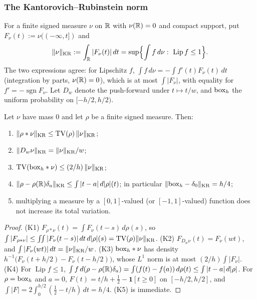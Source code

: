 \subsubsection{The Kantorovich--Rubinstein norm}\label{sec:kr}

For a finite signed measure $\nu$ on $\mathbb{R}$ with $\nu(\mathbb{R})=0$ and compact support, put $F_\nu(t):=\nu((-\infty,t])$ and
\[
  \lVert \nu\rVert_{\mathrm{KR}}:=\int_{\mathbb{R}}|F_\nu(t)|\,dt=\sup\Bigl\{\int f\,d\nu:\ \operatorname{Lip}f\le1\Bigr\}.
\]
The two expressions agree: for Lipschitz $f$, $\int f\,d\nu=-\int f'(t)F_\nu(t)\,dt$ (integration by parts, $\nu(\mathbb{R})=0$),
which is at most $\int|F_\nu|$, with equality for $f'=-\operatorname{sgn}F_\nu$. Let $D_w$ denote the push-forward under
$t\mapsto t/w$, and $\mathrm{box}_h$ the uniform probability on $[-h/2,h/2)$.

\begin{lemma}\label{lem:kr-facts}
Let $\nu$ have mass $0$ and let $\rho$ be a finite signed measure. Then:
\begin{enumerate}[label=(K\arabic*)]
\item $\lVert \rho*\nu\rVert_{\mathrm{KR}}\le\operatorname{TV}(\rho)\,\lVert \nu\rVert_{\mathrm{KR}}$;
\item $\lVert D_w\nu\rVert_{\mathrm{KR}}=\lVert \nu\rVert_{\mathrm{KR}}/w$;
\item $\operatorname{TV}(\mathrm{box}_h*\nu)\le(2/h)\,\lVert \nu\rVert_{\mathrm{KR}}$;
\item $\lVert \rho-\rho(\mathbb{R})\delta_a\rVert_{\mathrm{KR}}\le\int|t-a|\,d|\rho|(t)$; in particular $\lVert \mathrm{box}_h-\delta_0\rVert_{\mathrm{KR}}=h/4$;
\item multiplying a measure by a $[0,1]$-valued (or $[-1,1]$-valued) function does not increase its total variation.
\end{enumerate}
\end{lemma}

\begin{proof}
(K1) $F_{\rho*\nu}(t)=\int F_\nu(t-s)\,d\rho(s)$, so $\int|F_{\rho*\nu}|\le\iint|F_\nu(t-s)|\,dt\,d|\rho|(s)=\operatorname{TV}(\rho)\lVert \nu\rVert_{\mathrm{KR}}$.
(K2) $F_{D_w\nu}(t)=F_\nu(wt)$, and $\int|F_\nu(wt)|\,dt=\lVert \nu\rVert_{\mathrm{KR}}/w$.
(K3) $\mathrm{box}_h*\nu$ has density $h^{-1}\bigl(F_\nu(t+h/2)-F_\nu(t-h/2)\bigr)$, whose $L^1$ norm is at most $(2/h)\int|F_\nu|$.
(K4) For $\operatorname{Lip}f\le1$, $\int f\,d(\rho-\rho(\mathbb{R})\delta_a)=\int(f(t)-f(a))\,d\rho(t)\le\int|t-a|\,d|\rho|$. For
$\rho=\mathrm{box}_h$ and $a=0$, $F(t)=t/h+\tfrac12-\mathbf 1[t\ge0]$ on $[-h/2,h/2]$, and $\int|F|=2\int_0^{h/2}(\tfrac12-t/h)\,dt=h/4$.
(K5) is immediate.
\end{proof}

